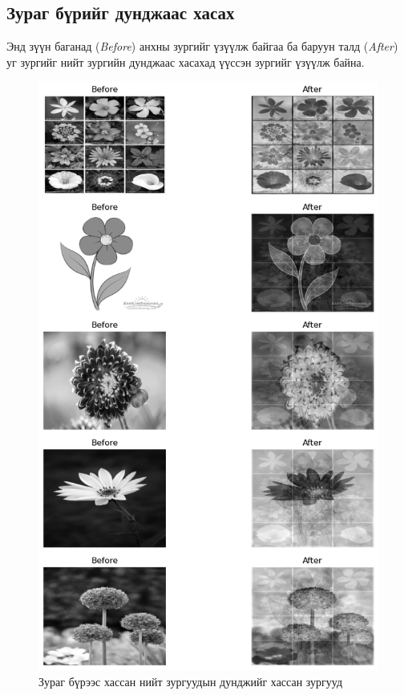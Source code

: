 \documentclass[a4paper]{article}
\begin{document}
\subsection{Зураг бүрийг дунджаас хасах}
Энд зүүн баганад (\textit{Before}) анхны зургийг үзүүлж байгаа ба баруун талд (\textit{After}) уг зургийг нийт зургийн дунджаас хасахад үүссэн зургийг үзүүлж байна.
\begin{figure}[H]
  \centering
  \includegraphics[scale = 0.5]{img2.png}
  \caption[Caption for Pointer example]{Зураг бүрээс хассан нийт зургуудын дунджийг хассан зургууд}
  \label{fig:example_1}
\end{figure}
\end{document}
